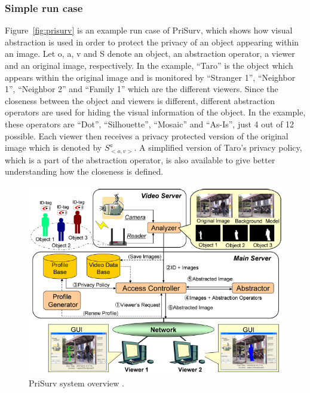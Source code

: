 \documentclass[conference]{IEEEtran}
\begin{document}
\subsubsection{Simple run case}
Figure~\ref{fig:prisurv} is an example run case of PriSurv, which shows how visual abstraction is used in order to protect the privacy of an object appearing within an image. Let o, a, v and S denote an object, an abstraction operator, a viewer and an original image, respectively. In the example, “Taro” is the object which appears within the original image and is monitored by “Stranger 1”, “Neighbor 1”, “Neighbor 2” and “Family 1” which are the different viewers. Since the closeness between the object and viewers is different, different abstraction operators are used for hiding the visual information of the object. In the example, these operators are “Dot”, “Silhouette”, “Mosaic” and “As-Is”, just 4 out of 12 possible. Each viewer then receives a privacy protected version of the original image which is denoted by $S_{<o, v>}^a$. A simplified version of Taro’s privacy policy, which is a part of the abstraction operator, is also available to give better understanding how the closeness is defined. 

\begin{figure}[t]
\centerline{\includegraphics[width=.5\textwidth]{img//prisurv_arch.png}}
\caption{PriSurv system overview \cite{chinomi2008PriSurv}.}
\label{fig:prisurv2}
\end{figure}
\end{document}
